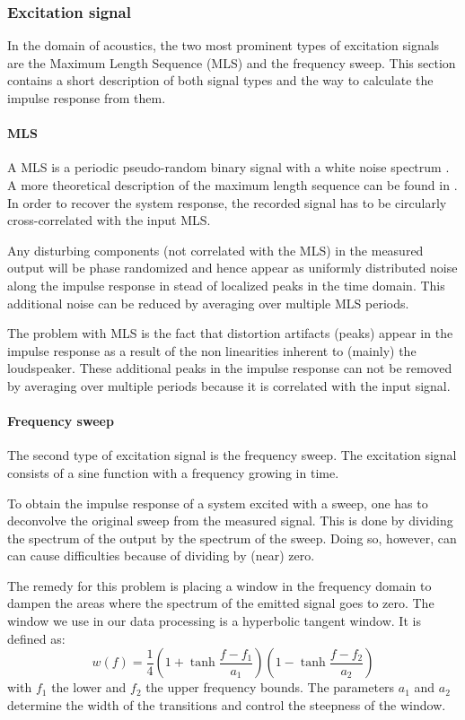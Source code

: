\subsubsection{Excitation signal}\label{exc}
In the domain of acoustics, the two most prominent types of excitation signals are the Maximum Length Sequence (MLS) and the frequency sweep.
This section contains a short description of both signal types and the way to calculate the impulse response from them. 

\paragraph{MLS}
A MLS is a periodic pseudo-random binary signal with a white noise spectrum \cite{Stan}. A more theoretical description of the maximum length sequence can be found in \cite{mls}.  In order to recover the system response, the recorded signal has to be circularly cross-correlated with the input MLS.

Any disturbing components (not correlated with the MLS) in the measured output will be phase randomized and hence appear as uniformly distributed noise along the impulse response in stead of localized peaks in the time domain\cite{Stan}. This additional noise can be reduced by averaging over multiple MLS periods.

The problem with MLS is the fact that distortion artifacts (peaks) appear in the impulse response as a result of the non linearities inherent to (mainly) the loudspeaker\cite{Geetere}. These additional peaks in the impulse response can not be removed by averaging over multiple periods because it is correlated with the input signal.


\paragraph{Frequency sweep}
The second type of excitation signal is the frequency sweep. The excitation signal consists of a sine function with a frequency growing in time.

To obtain the impulse response of a system excited with a sweep, one has to
deconvolve the original sweep from the measured signal. This is done by dividing the spectrum of the output by the spectrum of the sweep. Doing so, however, can can cause difficulties because of dividing by (near) zero.

The remedy for this problem is placing a window in the frequency domain to dampen the areas where the spectrum of the emitted signal goes to zero. The window we use in our data processing is a hyperbolic tangent window. It is defined as:
\[
w(f) = \frac{1}{4}\left(1 + \tanh \frac{f - f_1}{a_1}\right)
		\left(1 - \tanh \frac{f - f_2}{a_2}\right)
\]
with $f_1$ the lower and $f_2$ the upper frequency bounds. The parameters $a_1$ and $a_2$ determine the width of the transitions and control the steepness of the window.

